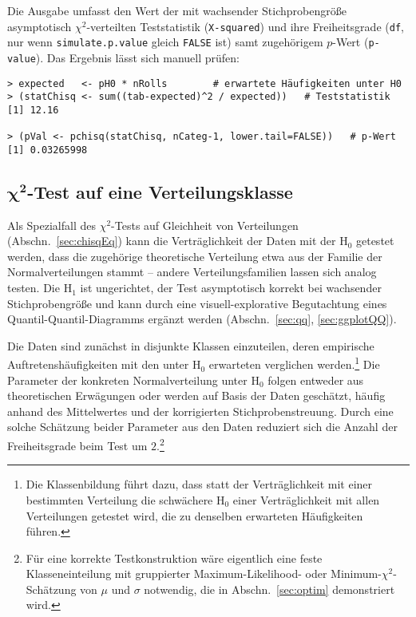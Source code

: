 Die Ausgabe umfasst den Wert der mit wachsender Stichprobengröße asymptotisch $\chi^{2}$-verteilten Teststatistik (\lstinline!X-squared!) und ihre Freiheitsgrade (\lstinline!df!, nur wenn \lstinline!simulate.p.value! gleich \lstinline!FALSE! ist) samt zugehörigem $p$-Wert (\lstinline!p-value!). Das Ergebnis lässt sich manuell prüfen:
\begin{lstlisting}
> expected   <- pH0 * nRolls        # erwartete Häufigkeiten unter H0
> (statChisq <- sum((tab-expected)^2 / expected))   # Teststatistik
[1] 12.16

> (pVal <- pchisq(statChisq, nCateg-1, lower.tail=FALSE))   # p-Wert
[1] 0.03265998
\end{lstlisting}

\subsection[\texorpdfstring{$\chi^{2}$}{chi2}-Test auf eine Verteilungsklasse]{$\bm{\chi^{2}}$-Test auf eine Verteilungsklasse}
\label{sec:chisqGof}

Als Spezialfall des $\chi^{2}$-Tests auf Gleichheit von Verteilungen (Abschn.\ \ref{sec:chisqEq}) kann die Verträglichkeit der Daten mit der $\text{H}_{0}$ getestet werden, dass die zugehörige theoretische Verteilung etwa aus der Familie der Normalverteilungen stammt -- andere Verteilungsfamilien lassen sich analog testen. Die $\text{H}_{1}$ ist ungerichtet, der Test asymptotisch korrekt bei wachsender Stichprobengröße und kann durch eine visuell-explorative Begutachtung eines Quantil-Quantil-Diagramms ergänzt werden (Abschn.\ \ref{sec:qq}, \ref{sec:ggplotQQ}).

Die Daten sind zunächst in disjunkte Klassen einzuteilen, deren empirische Auftretenshäufigkeiten mit den unter $\text{H}_{0}$ erwarteten verglichen werden.\footnote{Die Klassenbildung führt dazu, dass statt der Verträglichkeit mit einer bestimmten Verteilung die schwächere $\text{H}_{0}$ einer Verträglichkeit mit allen Verteilungen getestet wird, die zu denselben erwarteten Häufigkeiten führen.} Die Parameter der konkreten Normalverteilung unter $\text{H}_{0}$ folgen entweder aus theoretischen Erwägungen oder werden auf Basis der Daten geschätzt, häufig anhand des Mittelwertes und der korrigierten Stichprobenstreuung. Durch eine solche Schätzung beider Parameter aus den Daten reduziert sich die Anzahl der Freiheitsgrade beim Test um $2$.\footnote{Für eine korrekte Testkonstruktion wäre eigentlich eine feste Klasseneinteilung mit gruppierter Maximum-Likelihood- oder Minimum-$\chi^{2}$-Schätzung von $\mu$ und $\sigma$ notwendig, die in Abschn.\ \ref{sec:optim} demonstriert wird.}

